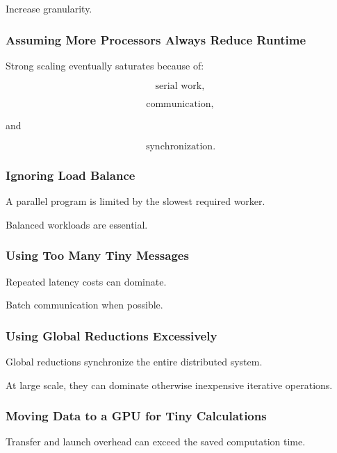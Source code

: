 Increase granularity.

\subsubsection{Assuming More Processors Always Reduce Runtime}

Strong scaling eventually saturates because of:

\[
\boxed{
\text{serial work},
}
\]

\[
\boxed{
\text{communication},
}
\]

and

\[
\boxed{
\text{synchronization}.
}
\]

\subsubsection{Ignoring Load Balance}

A parallel program is limited by the slowest required worker.

Balanced workloads are essential.

\subsubsection{Using Too Many Tiny Messages}

Repeated latency costs can dominate.

Batch communication when possible.

\subsubsection{Using Global Reductions Excessively}

Global reductions synchronize the entire distributed system.

At large scale, they can dominate otherwise inexpensive iterative
operations.

\subsubsection{Moving Data to a GPU for Tiny Calculations}

Transfer and launch overhead can exceed the saved computation time.

